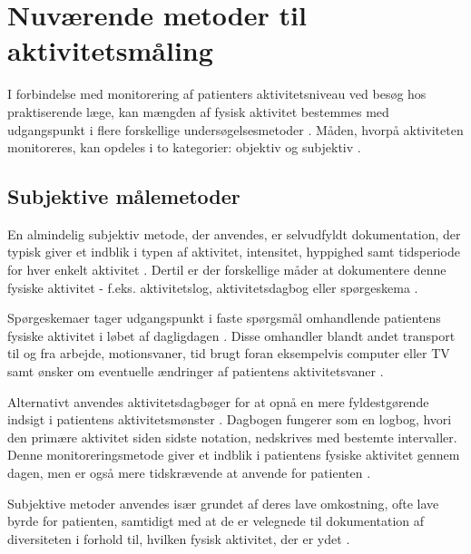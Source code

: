 \section{Nuværende metoder til aktivitetsmåling} \label{NuMetode}

I forbindelse med monitorering af patienters aktivitetsniveau ved besøg hos praktiserende læge, kan mængden af fysisk aktivitet bestemmes med udgangspunkt i flere forskellige undersøgelsesmetoder \citep{motionsraad2007}. 
Måden, hvorpå aktiviteten monitoreres, kan opdeles i to kategorier: objektiv og subjektiv \citep{motionsraad2007, adamo2009}. 
 
\subsection{Subjektive målemetoder}

En almindelig subjektiv metode, der anvendes, er selvudfyldt dokumentation, der typisk giver et indblik i typen af aktivitet, intensitet, hyppighed samt tidsperiode for hver enkelt aktivitet \citep{adamo2009}. Dertil er der forskellige måder at dokumentere denne fysiske aktivitet - f.eks. aktivitetslog, aktivitetsdagbog eller spørgeskema \citep{adamo2009}. 


Spørgeskemaer tager udgangspunkt i faste spørgsmål omhandlende patientens fysiske aktivitet i løbet af dagligdagen \citep{muller2009}. 
Disse omhandler blandt andet transport til og fra arbejde, motionsvaner, tid brugt foran eksempelvis computer eller TV samt ønsker om eventuelle ændringer af patientens aktivitetsvaner \citep{motionsraad2007, vestergaard2012}. 

Alternativt anvendes aktivitetsdagbøger for at opnå en mere fyldestgørende indsigt i patientens aktivitetsmønster \citep{motionsraad2007,muller2009}. 
Dagbogen fungerer som en logbog, hvori den primære aktivitet siden sidste notation, nedskrives med bestemte intervaller. 
Denne monitoreringsmetode giver et indblik i patientens fysiske aktivitet gennem dagen, men er også mere tidskrævende at anvende for patienten \citep{motionsraad2007}.


Subjektive metoder anvendes især grundet af deres lave omkostning, ofte lave byrde for patienten, samtidigt med at de er velegnede til dokumentation af diversiteten i forhold til, hvilken fysisk aktivitet, der er ydet \citep{adamo2009}.

